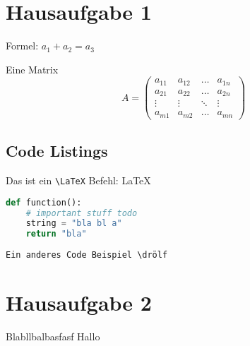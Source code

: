 \documentclass[a4paper,onecolumn]{scrartcl}
\title{\mytitle{}}
\subtitle{\mysubtitle{}}
\author{\myname{}}
\date{\mydate{}}
\newif\ifdraft\draftfalse
\numberwithin{equation}{subsection}
\theoremstyle{plain}
\theoremstyle{remark}
\begin{document}
\ifdraft\else\maketitle\fi

\setcounter{tocdepth}{2}
\setcounter{secnumdepth}{0}
\tableofcontents


\section{Hausaufgabe 1}

Formel: $ a_1 + a_2 = a_3 $

Eine Matrix
\begin{equation}
  A = \begin{pmatrix}
    a_{11}  & a_{12} & \ldots & a_{1n} \\
    a_{21}  & a_{22} & \ldots & a_{2n} \\
    \vdots & \vdots & \ddots & \vdots \\
    a_{m1} & a_{m2} & \ldots & a_{mn}
  \end{pmatrix}
\end{equation}

\subsection{Code Listings}

Das ist ein \verb+\LaTeX+ Befehl: \LaTeX

\begin{lstlisting}[caption={Useless Code},language=Python]
def function():
    # important stuff todo
    string = "bla bl a"
    return "bla"
\end{lstlisting}

\begin{verbatim}
Ein anderes Code Beispiel \drölf
\end{verbatim}

\section{Hausaufgabe 2}

Blabllbalbasfasf Hallo

\end{document}

